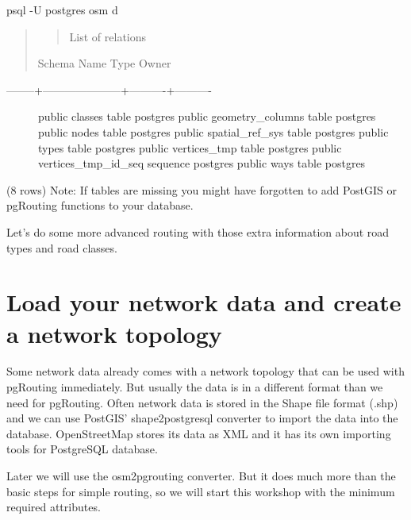 \documentclass[a4paper,10pt,english]{manual}
\begin{document}
psql -U postgres osm
d
\begin{quote}
\begin{quote}

List of relations
\end{quote}

Schema \textbar{}        Name         \textbar{}   Type   \textbar{}  Owner
\end{quote}
\begin{description}
\item[--------+---------------------+----------+----------] \leavevmode
public \textbar{} classes             \textbar{} table    \textbar{} postgres
public \textbar{} geometry\_columns    \textbar{} table    \textbar{} postgres
public \textbar{} nodes               \textbar{} table    \textbar{} postgres
public \textbar{} spatial\_ref\_sys     \textbar{} table    \textbar{} postgres
public \textbar{} types               \textbar{} table    \textbar{} postgres
public \textbar{} vertices\_tmp        \textbar{} table    \textbar{} postgres
public \textbar{} vertices\_tmp\_id\_seq \textbar{} sequence \textbar{} postgres
public \textbar{} ways                \textbar{} table    \textbar{} postgres

\end{description}

(8 rows)
Note: If tables are missing you might have forgotten to add PostGIS or pgRouting functions to your database.

Let's do some more advanced routing with those extra information about road types and road classes.

\resetcurrentobjects
\hypertarget{--doc-chapters/topology}{}

\chapter{Load your network data and create a network topology}

Some network data already comes with a network topology that can be used with pgRouting immediately. But usually the data is in a different format than we need for pgRouting. Often network data is stored in the Shape file format (.shp) and we can use PostGIS' shape2postgresql converter to import the data into the database. OpenStreetMap stores its data as XML and it has its own importing tools for PostgreSQL database.

Later we will use the osm2pgrouting converter. But it does much more than the basic steps for simple routing, so we will start this workshop with the minimum required attributes.
\end{document}
